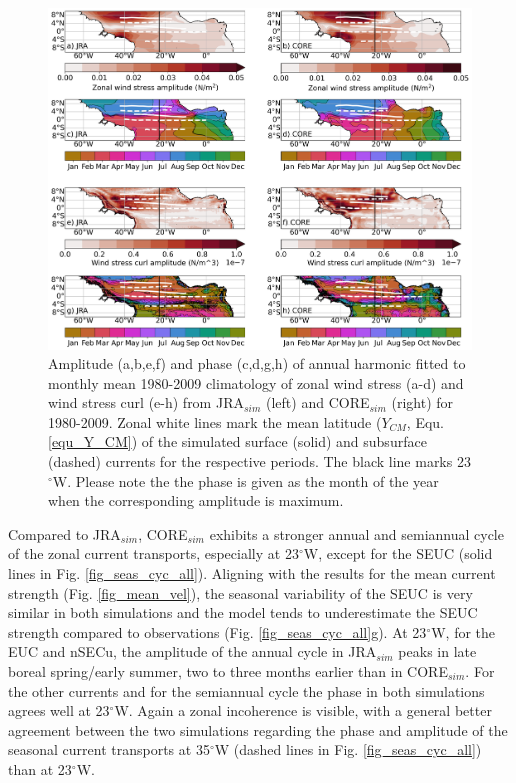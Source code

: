 \documentclass[os, manuscript]{copernicus}
\begin{document}
\begin{figure}[t]
	\includegraphics[width=12cm]{../../figures/paper/f03_INALT20_wind_taux_curl_AH_5d_clim_1980_2009.png}
	\caption{Amplitude (a,b,e,f) and phase (c,d,g,h) of annual harmonic fitted to monthly mean 1980-2009 climatology of zonal wind stress (a-d)  and wind stress curl (e-h) from JRA$_{sim}$ (left) and CORE$_{sim}$ (right) for 1980-2009. Zonal white lines mark the mean latitude ($ Y_{CM} $, Equ. \ref{equ_Y_CM}) of the simulated surface (solid) and subsurface (dashed) currents for the respective periods. The black line marks 23$^{\circ}$W. Please note the the phase is given as the month of the year when the corresponding amplitude is maximum.}
	\label{fig_harm_fit_curl}
\end{figure} 

Compared to JRA$_{sim}$, CORE$_{sim}$ exhibits a stronger annual and semiannual cycle of the zonal current transports, especially at 23$^{\circ}$W, except for the SEUC (solid lines in Fig. \ref{fig_seas_cyc_all}). Aligning with the results for the mean current strength (Fig. \ref{fig_mean_vel}), the seasonal variability of the SEUC is very similar in both simulations and the model tends to underestimate the SEUC strength compared to observations (Fig. \ref{fig_seas_cyc_all}g). At 23$^{\circ}$W, for the EUC and nSECu, the amplitude of the annual cycle in JRA$_{sim}$ peaks in late boreal spring/early summer, two to three months earlier than in CORE$_{sim}$. For the other currents and for the semiannual cycle the phase in both simulations agrees well at 23$^{\circ}$W. Again a zonal incoherence is visible, with a general better agreement between the two simulations regarding the phase and amplitude of the seasonal current transports at 35$^{\circ}$W (dashed lines in Fig. \ref{fig_seas_cyc_all}) than at 23$^{\circ}$W.
\end{document}
